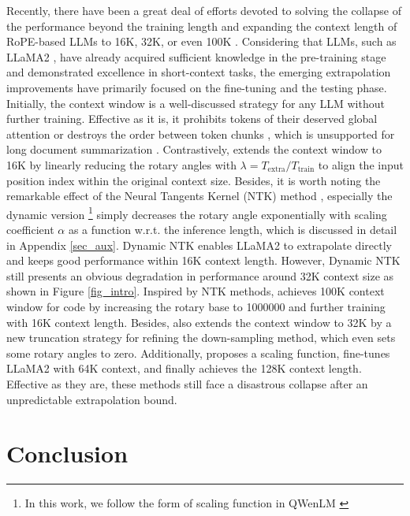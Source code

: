 Recently, there have been a great deal of efforts devoted to solving the collapse of the performance beyond the training length and expanding the context length of RoPE-based LLMs to 16K, 32K, or even 100K \citep{chen2023extending,rerope,fixedNTK}. Considering that LLMs, such as LLaMA2 \citep{touvron2023llama2}, have already acquired sufficient knowledge in the pre-training stage and demonstrated excellence in short-context tasks, the emerging extrapolation improvements have primarily focused on the fine-tuning and the testing phase. Initially, the context window is a well-discussed strategy for any LLM without further training. Effective as it is, it prohibits tokens of their deserved global attention \citep{han2023lm} or destroys the order between token chunks \citep{ratner2022parallel,kexuefm9617}, which is unsupported for long document summarization \citep{kexuefm9617}. Contrastively, \citet{chen2023extending} extends the context window to 16K by linearly reducing the rotary angles with $\lambda=T_\text{extra}/T_\text{train}$ to align the input position index within the original context size. Besides, it is worth noting the remarkable effect of the Neural Tangents Kernel (NTK) method \citep{fixedNTK}, especially the dynamic version \citep{dynamicNTK} \footnote{In this work, we follow the form of scaling function in QWenLM \citep{qwen}} simply decreases the rotary angle exponentially with scaling coefficient $\alpha$ as a function w.r.t. the inference length, which is discussed in detail in Appendix \ref{sec_aux}. Dynamic NTK enables LLaMA2\citep{touvron2023llama2} to extrapolate directly and keeps good performance within 16K context length. However, Dynamic NTK still presents an obvious degradation in performance around 32K context size as shown in Figure \ref{fig_intro}. Inspired by NTK methods, \citet{roziere2023code} achieves 100K context window for code by increasing the rotary base to 1000000 and further training with 16K context length. Besides, \citet{pal2023giraffe} also extends the context window to 32K by a new truncation strategy for refining the down-sampling method, which even sets some rotary angles to zero. Additionally, \citet{peng2023yarn} proposes a scaling function, fine-tunes LLaMA2 with 64K context, and finally achieves the 128K context length. Effective as they are, these methods still face a disastrous collapse after an unpredictable extrapolation bound.

\section{Conclusion}

